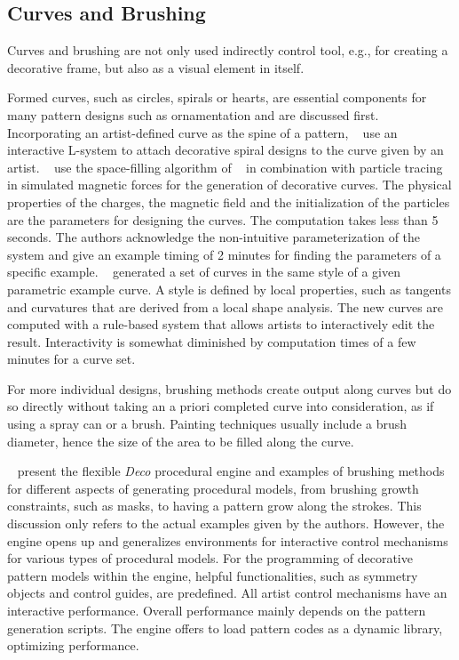 

\subsection{Curves and Brushing}
\label{subsec:analysis_curves}

Curves and brushing are not only used indirectly control tool, e.g., for creating a decorative frame, but also as a visual element in itself. 

Formed curves, such as circles, spirals or hearts, are essential components for many pattern designs such as ornamentation and are discussed first. Incorporating an artist-defined curve as the spine of a pattern, \citeauthor*{yu_2012_ans}~\cite{yu_2012_ans} use an interactive L-system to attach decorative spiral designs to the curve given by an artist. \citeauthor*{xu_2009_mcc}~\cite{xu_2009_mcc} use the space-filling algorithm of \citeauthor*{wong_1998_cgf}~\cite{wong_1998_cgf} in combination with particle tracing in simulated magnetic forces for the generation of decorative curves. The physical properties of the charges, the magnetic field and the initialization of the particles are the parameters for designing the curves. The computation takes less than 5 seconds. The authors acknowledge the non-intuitive parameterization of the system and give an example timing of 2 minutes for finding the parameters of a specific example. \citeauthor*{merrell_2010_ecs}~\cite{merrell_2010_ecs} generated a set of curves in the same style of a given parametric example curve. A style is defined by local properties, such as tangents and curvatures that are derived from a local shape analysis. The new curves are computed with a rule-based system that allows artists to interactively edit the result. Interactivity is somewhat diminished by computation times of a few minutes for a curve set.

For more individual designs, brushing methods create output along curves but do so directly without taking an a priori completed curve into consideration, as if using a spray can or a brush. Painting techniques usually include a brush diameter, hence the size of the area to be filled along the curve. 

\citeauthor*{mech_2012_tdf}~\cite{mech_2012_tdf} present the flexible \textit{Deco} procedural engine and examples of brushing methods for different aspects of generating procedural models, from brushing growth constraints, such as masks, to having a pattern grow along the strokes. This discussion only refers to the actual examples given by the authors. However, the engine opens up and generalizes environments for interactive control mechanisms for various types of procedural models. For the programming of decorative pattern models within the engine, helpful functionalities, such as symmetry objects and control guides, are predefined. All artist control mechanisms have an interactive performance. Overall performance mainly depends on the pattern generation scripts. The engine offers to load pattern codes as a dynamic library, optimizing performance. 

